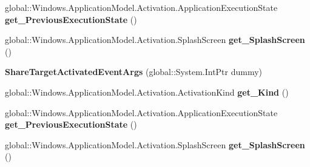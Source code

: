 \begin{DoxyCompactItemize}
global\+::\+Windows.\+Application\+Model.\+Activation.\+Application\+Execution\+State {\bfseries get\+\_\+\+Previous\+Execution\+State} ()
\item 
\mbox{\label{class_windows_1_1_application_model_1_1_activation_1_1_share_target_activated_event_args_a1c84d9d210a87e6279fce1cea17244e2}} 
global\+::\+Windows.\+Application\+Model.\+Activation.\+Splash\+Screen {\bfseries get\+\_\+\+Splash\+Screen} ()
\item 
\mbox{\label{class_windows_1_1_application_model_1_1_activation_1_1_share_target_activated_event_args_ac8dc2977a1b7387b5174d423f0f358ff}} 
{\bfseries Share\+Target\+Activated\+Event\+Args} (global\+::\+System.\+Int\+Ptr dummy)
\item 
\mbox{\label{class_windows_1_1_application_model_1_1_activation_1_1_share_target_activated_event_args_a6f63726ec764ab6a3e1fec6b977f8dc5}} 
global\+::\+Windows.\+Application\+Model.\+Activation.\+Activation\+Kind {\bfseries get\+\_\+\+Kind} ()
\item 
\mbox{\label{class_windows_1_1_application_model_1_1_activation_1_1_share_target_activated_event_args_a64b106b72efc80cb3b89078a4207e3b0}} 
global\+::\+Windows.\+Application\+Model.\+Activation.\+Application\+Execution\+State {\bfseries get\+\_\+\+Previous\+Execution\+State} ()
\item 
\mbox{\label{class_windows_1_1_application_model_1_1_activation_1_1_share_target_activated_event_args_a1c84d9d210a87e6279fce1cea17244e2}} 
global\+::\+Windows.\+Application\+Model.\+Activation.\+Splash\+Screen {\bfseries get\+\_\+\+Splash\+Screen} ()
\item 
\mbox{\label{class_windows_1_1_application_model_1_1_activation_1_1_share_target_activated_event_args_ac8dc2977a1b7387b5174d423f0f358ff}} 

\end{DoxyCompactItemize}
